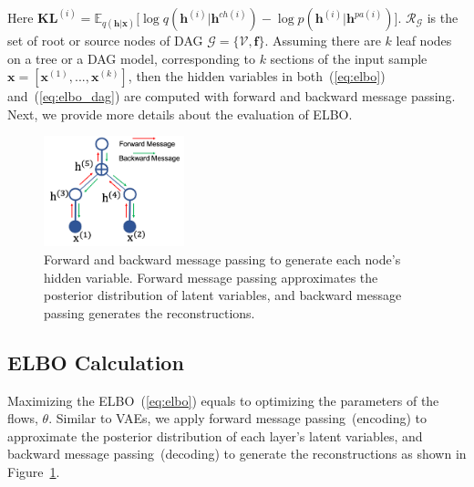 \documentclass{article}
\begin{document}
Here $\mathbf{KL}^{(i)}=\mathbb{E}_{q(\mathbf{h}|\mathbf{x})}\big[  \log q(\mathbf{h}^{(i)}|\mathbf{h}^{ch(i)})   - \log p(\mathbf{h}^{(i)}|\mathbf{h}^{pa(i)}) \big]$.  $\mathcal{R}_{ \mathcal{G}}$ is the set of root or source nodes of DAG $\mathcal{G} = \{\mathcal{V}, \mathbf{f}\}$. Assuming there are $k$ leaf nodes on a tree or a DAG model, corresponding to $k$ sections of the input sample $\mathbf{x} = [\mathbf{x}^{(1)}, ..., \mathbf{x}^{(k)}]$, then the hidden variables in both~(\ref{eq:elbo}) and~(\ref{eq:elbo_dag}) are computed with forward and backward message passing. Next, we provide more details about the evaluation of  ELBO.
\begin{figure}
\vspace{-0.1in}
\begin{center}
 \includegraphics[width=1.6in]{fig/tree_node_message.png}
\end{center}
   \caption{Forward and backward message passing to generate each node's hidden variable. Forward message passing  approximates the posterior distribution of latent variables, and backward message passing generates the reconstructions. }
\label{fig:tree_message}
\vspace{-0.1in}
\end{figure}
\vspace{-0.1in}
\subsection{ELBO Calculation}
Maximizing the ELBO~(\ref{eq:elbo}) equals to  optimizing the parameters of the flows, $\theta$.  Similar to VAEs, we apply forward message passing~(encoding) to approximate the posterior  distribution of each layer's latent variables, and backward message passing~(decoding) to  generate the reconstructions as shown in Figure~\ref{fig:tree_message}. 
\end{document}
